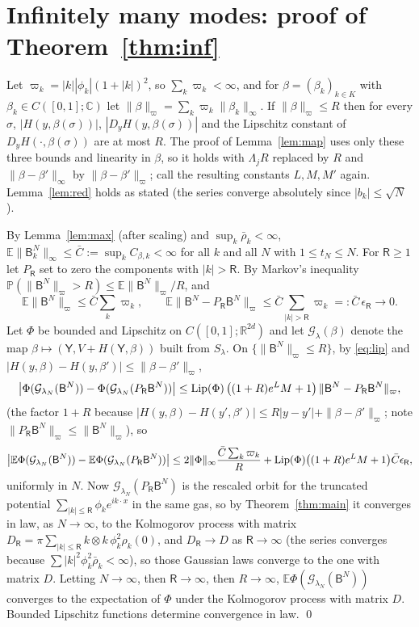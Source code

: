 \documentclass[11pt]{article}
\newcommand{\E}{\mathbb{E}}
\newcommand{\PP}{\mathbb{P}}
\newcommand{\R}{\mathbb{R}}
\newcommand{\C}{\mathbb{C}}
\newcommand{\sY}{\mathsf{Y}}
\newcommand{\sB}{\mathsf{B}}
\newcommand{\bbar}{\bar\rho}
\newcommand{\nrm}[1]{\|#1\|_\infty}
\theoremstyle{remark}
\begin{document}
\section{Infinitely many modes: proof of Theorem~\ref{thm:inf}}

Let $\varpi_k=|k||\phi_k|(1+|k|)^2$, so $\sum_k\varpi_k<\infty$, and for
$\beta=(\beta_k)_{k\in K}$ with $\beta_k\in C([0,1];\C)$ let
$\|\beta\|_\varpi=\sum_k\varpi_k\nrm{\beta_k}$. If
$\|\beta\|_\varpi\le R$ then for every $\sigma$,
$|H(y,\beta(\sigma))|$, $|D_yH(y,\beta(\sigma))|$ and the Lipschitz
constant of $D_yH(\cdot,\beta(\sigma))$ are at most $R$. The proof of
Lemma~\ref{lem:map} uses only these three bounds and linearity in $\beta$,
so it holds with $\Lambda_jR$ replaced by $R$ and $\nrm{\beta-\beta'}$ by
$\|\beta-\beta'\|_\varpi$; call the resulting constants $L,M,M'$ again.
Lemma~\ref{lem:red} holds as stated (the series converge absolutely since
$|b_k|\le\sqrt N$).

By Lemma~\ref{lem:max} (after scaling) and $\sup_k\bbar_k<\infty$,
$\E\nrm{\sB^N_k}\le\bar C:=\sup_kC_{\beta,k}<\infty$ for all $k$ and all $N$
with $1\le t_N\le N$. For $\mathsf R\ge1$ let $P_{\mathsf R}$ set to zero
the components with $|k|>\mathsf R$. By Markov's inequality
$\PP(\|\sB^N\|_\varpi>R)\le\E\|\sB^N\|_\varpi/R$, and
\[
  \E\|\sB^N\|_\varpi\le\bar C\sum_k\varpi_k,\qquad
  \E\|\sB^N-P_{\mathsf R}\sB^N\|_\varpi\le\bar C\sum_{|k|>\mathsf R}\varpi_k
  =:\bar C\,\epsilon_{\mathsf R}\to0 .
\]
Let $\Phi$ be bounded and Lipschitz on $C([0,1];\R^{2d})$ and let
$\mathcal G_\lambda(\beta)$ denote the map
$\beta\mapsto(\sY,V+H(\sY,\beta))$ built from $S_\lambda$. On
$\{\|\sB^N\|_\varpi\le R\}$, by \eqref{eq:lip} and
$|H(y,\beta)-H(y,\beta')|\le\|\beta-\beta'\|_\varpi$,
\[
  \bigl|\Phi(\mathcal G_{\lambda_N}(\sB^N))
  -\Phi(\mathcal G_{\lambda_N}(P_{\mathsf R}\sB^N))\bigr|
  \le{\rm Lip}(\Phi)\,\bigl((1+R)e^LM+1\bigr)\,
  \|\sB^N-P_{\mathsf R}\sB^N\|_\varpi ,
\]
(the factor $1+R$ because
$|H(y,\beta)-H(y',\beta')|\le R|y-y'|+\|\beta-\beta'\|_\varpi$; note
$\|P_{\mathsf R}\sB^N\|_\varpi\le\|\sB^N\|_\varpi$), so
\[
  \bigl|\E\Phi(\mathcal G_{\lambda_N}(\sB^N))
  -\E\Phi(\mathcal G_{\lambda_N}(P_{\mathsf R}\sB^N))\bigr|
  \le2\nrm{\Phi}\frac{\bar C\sum_k\varpi_k}{R}
  +{\rm Lip}(\Phi)\bigl((1+R)e^LM+1\bigr)\bar C\epsilon_{\mathsf R},
\]
uniformly in $N$. Now $\mathcal G_{\lambda_N}(P_{\mathsf R}\sB^N)$ is the
rescaled orbit for the truncated potential
$\sum_{|k|\le\mathsf R}\phi_ke^{ik\cdot x}$ in the same gas, so by
Theorem~\ref{thm:main} it converges in law, as $N\to\infty$, to the
Kolmogorov process with matrix
$D_{\mathsf R}=\pi\sum_{|k|\le\mathsf R}k\otimes k\,\phi_k^2\rho_k(0)$, and
$D_{\mathsf R}\to D$ as $\mathsf R\to\infty$ (the series converges because
$\sum|k|^2\phi_k^2\bbar_k<\infty$), so those Gaussian laws converge to the
one with matrix $D$. Letting $N\to\infty$, then $\mathsf R\to\infty$, then
$R\to\infty$, $\E\Phi(\mathcal G_{\lambda_N}(\sB^N))$ converges to the
expectation of $\Phi$ under the Kolmogorov process with matrix $D$. Bounded
Lipschitz functions determine convergence in law. \qed
\end{document}
